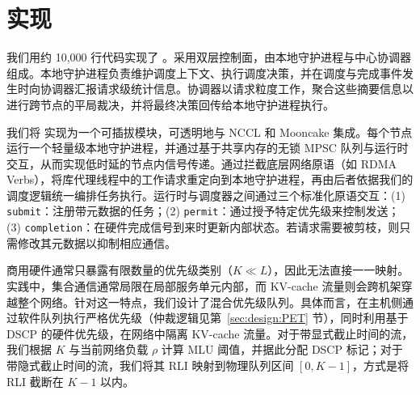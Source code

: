 \section{实现}

我们用约 10,000 行代码实现了 \sys{}。\sys 采用双层控制面，由本地守护进程与中心协调器组成。本地守护进程负责维护调度上下文、执行调度决策，并在调度与完成事件发生时向协调器汇报请求级统计信息。协调器以请求粒度工作，聚合这些摘要信息以进行跨节点的平局裁决，并将最终决策回传给本地守护进程执行。

我们将 \sys 实现为一个可插拔模块，可透明地与 NCCL 和 Mooncake 集成。每个节点运行一个轻量级本地守护进程，并通过基于共享内存的无锁 MPSC 队列与运行时交互，从而实现低时延的节点内信号传递。通过拦截底层网络原语（如 RDMA Verbs），\sys 将库代理线程中的工作请求重定向到本地守护进程，再由后者依据我们的调度逻辑统一编排任务执行。运行时与调度器之间通过三个标准化原语交互：(1) \texttt{submit}：注册带元数据的任务；(2) \texttt{permit}：通过授予特定优先级来控制发送；(3) \texttt{completion}：在硬件完成信号到来时更新内部状态。若请求需要被剪枝，则只需修改其元数据以抑制相应通信。

 商用硬件通常只暴露有限数量的优先级类别（$K \ll L$），因此无法直接一一映射。实践中，集合通信通常局限在局部服务单元内部，而 KV-cache 流量则会跨机架穿越整个网络。针对这一特点，我们设计了混合优先级队列。具体而言，\sys 在主机侧通过软件队列执行严格优先级（仲裁逻辑见第~\ref{sec:design:PET} 节），同时利用基于 DSCP 的硬件优先级，在网络中隔离 KV-cache 流量。对于带显式截止时间的流，我们根据 $K$ 与当前网络负载 $\rho$ 计算 MLU 阈值，并据此分配 DSCP 标记；对于带隐式截止时间的流，我们将其 RLI 映射到物理队列区间 $[0, K-1]$，方式是将 RLI 截断在 $K-1$ 以内。
